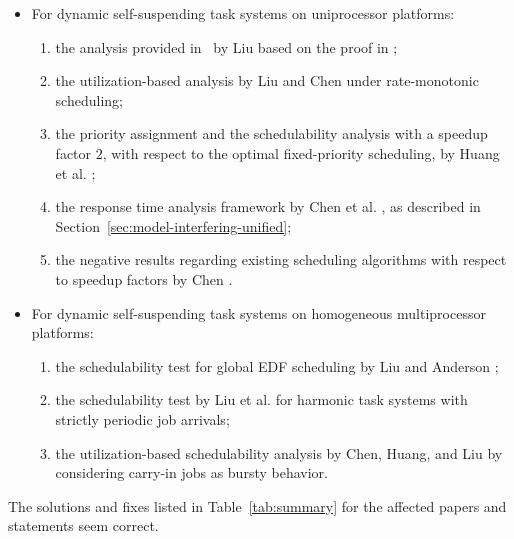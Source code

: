 \begin{itemize}
\item For dynamic self-suspending task systems on uniprocessor
  platforms:
  \begin{enumerate}
  \item the analysis provided in~\cite[Pages
    164-165]{Liu:2000:RS:518501} by Liu based on the proof in \cite{ChenHuangNelissen,ChenECRTS2016-suspension}; 
  \item the utilization-based analysis by Liu and Chen
    \cite{LiuChen:rtss2014} under rate-monotonic scheduling;
  \item the priority assignment and the schedulability analysis with a
    speedup factor $2$, with respect to the optimal fixed-priority
    scheduling, by Huang et
    al. \cite{huangpass:dac2015};
  \item the response time analysis framework by Chen et al. \cite{ChenECRTS2016-suspension}, as described in Section~\ref{sec:model-interfering-unified};
  \item the negative results regarding existing scheduling algorithms with respect to speedup factors by Chen \cite{RTSS2016-suspension}.
  \end{enumerate}
\item For dynamic self-suspending task systems on homogeneous multiprocessor
  platforms:
  \begin{enumerate}
  \item the schedulability test for global EDF scheduling by Liu and
    Anderson \cite{DBLP:conf/ecrts/LiuA13};
  \item the schedulability test by Liu et
    al. \cite{DBLP:conf/ecrts/LiuCH014} for harmonic task
    systems with strictly periodic job arrivals;
  \item the utilization-based schedulability analysis by Chen, Huang,
    and Liu \cite{ChenHLRTSS2015} by considering carry-in jobs as
    bursty behavior.
  \end{enumerate}
\end{itemize}
The solutions and fixes listed in Table~\ref{tab:summary} for the
affected papers and statements seem correct.




